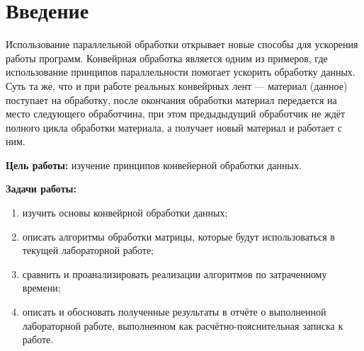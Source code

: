 \chapter*{Введение}

Использование параллельной обработки открывает новые способы для
ускорения работы программ.
Конвейрная обработка является одним из примеров, где использование принципов параллельности помогает ускорить обработку данных. 
Суть та же, что и при работе реальных конвейрных лент --- материал (данное) поступает на обработку, после окончания обработки материал передается на место следующего обработчина, при этом предыдыдущий обработчик не ждёт полного цикла обработки материала, а получает новый материал и работает с ним.


\textbf{Цель работы:} изучение принципов конвейерной обработки данных.

\textbf{Задачи работы:}
\begin{enumerate}[label=\arabic*)]
	\item изучить основы конвейрной обработки данных;
	\item описать алгоритмы обработки матрицы, которые будут использоваться в текущей лабораторной работе;
	\item сравнить и проанализировать реализации алгоритмов по затраченному времени;
	\item описать и обосновать полученные результаты в отчёте о выполненной лабораторной работе, выполненном как расчётно-пояснительная записка к работе.
\end{enumerate}
